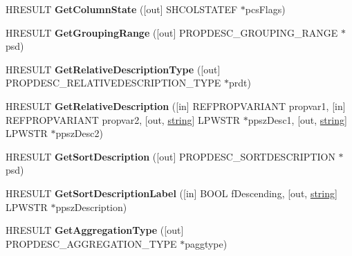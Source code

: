 \begin{DoxyCompactItemize}
H\+R\+E\+S\+U\+LT {\bfseries Get\+Column\+State} (\mbox{[}out\mbox{]} S\+H\+C\+O\+L\+S\+T\+A\+T\+EF $\ast$pcs\+Flags)
\item 
\mbox{\label{interface_i_property_description_a7d7a28eabb56e7fcb3edd8e35c758004}} 
H\+R\+E\+S\+U\+LT {\bfseries Get\+Grouping\+Range} (\mbox{[}out\mbox{]} P\+R\+O\+P\+D\+E\+S\+C\+\_\+\+G\+R\+O\+U\+P\+I\+N\+G\+\_\+\+R\+A\+N\+GE $\ast$psd)
\item 
\mbox{\label{interface_i_property_description_aaf2c8c660bfa5a20bcc7db4f49e3f1c7}} 
H\+R\+E\+S\+U\+LT {\bfseries Get\+Relative\+Description\+Type} (\mbox{[}out\mbox{]} P\+R\+O\+P\+D\+E\+S\+C\+\_\+\+R\+E\+L\+A\+T\+I\+V\+E\+D\+E\+S\+C\+R\+I\+P\+T\+I\+O\+N\+\_\+\+T\+Y\+PE $\ast$prdt)
\item 
\mbox{\label{interface_i_property_description_aa53bb555a7bf17c5f6a2769ddbf88960}} 
H\+R\+E\+S\+U\+LT {\bfseries Get\+Relative\+Description} (\mbox{[}in\mbox{]} R\+E\+F\+P\+R\+O\+P\+V\+A\+R\+I\+A\+NT propvar1, \mbox{[}in\mbox{]} R\+E\+F\+P\+R\+O\+P\+V\+A\+R\+I\+A\+NT propvar2, \mbox{[}out, \hyperlink{structstring}{string}\mbox{]} L\+P\+W\+S\+TR $\ast$ppsz\+Desc1, \mbox{[}out, \hyperlink{structstring}{string}\mbox{]} L\+P\+W\+S\+TR $\ast$ppsz\+Desc2)
\item 
\mbox{\label{interface_i_property_description_a3eacd9be5ebd80646e4d92ae0cf8b976}} 
H\+R\+E\+S\+U\+LT {\bfseries Get\+Sort\+Description} (\mbox{[}out\mbox{]} P\+R\+O\+P\+D\+E\+S\+C\+\_\+\+S\+O\+R\+T\+D\+E\+S\+C\+R\+I\+P\+T\+I\+ON $\ast$psd)
\item 
\mbox{\label{interface_i_property_description_a1db00213b63ed7a6b0568c347f5d2607}} 
H\+R\+E\+S\+U\+LT {\bfseries Get\+Sort\+Description\+Label} (\mbox{[}in\mbox{]} B\+O\+OL f\+Descending, \mbox{[}out, \hyperlink{structstring}{string}\mbox{]} L\+P\+W\+S\+TR $\ast$ppsz\+Description)
\item 
\mbox{\label{interface_i_property_description_ab667ab21e5a6fb97a0ebbc12e79c84e4}} 
H\+R\+E\+S\+U\+LT {\bfseries Get\+Aggregation\+Type} (\mbox{[}out\mbox{]} P\+R\+O\+P\+D\+E\+S\+C\+\_\+\+A\+G\+G\+R\+E\+G\+A\+T\+I\+O\+N\+\_\+\+T\+Y\+PE $\ast$paggtype)

\end{DoxyCompactItemize}
